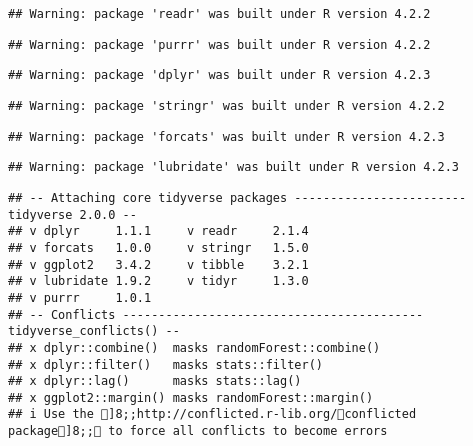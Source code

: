 \documentclass[
]{article}
\begin{document}
\begin{verbatim}
## Warning: package 'readr' was built under R version 4.2.2
\end{verbatim}

\begin{verbatim}
## Warning: package 'purrr' was built under R version 4.2.2
\end{verbatim}

\begin{verbatim}
## Warning: package 'dplyr' was built under R version 4.2.3
\end{verbatim}

\begin{verbatim}
## Warning: package 'stringr' was built under R version 4.2.2
\end{verbatim}

\begin{verbatim}
## Warning: package 'forcats' was built under R version 4.2.3
\end{verbatim}

\begin{verbatim}
## Warning: package 'lubridate' was built under R version 4.2.3
\end{verbatim}

\begin{verbatim}
## -- Attaching core tidyverse packages ------------------------ tidyverse 2.0.0 --
## v dplyr     1.1.1     v readr     2.1.4
## v forcats   1.0.0     v stringr   1.5.0
## v ggplot2   3.4.2     v tibble    3.2.1
## v lubridate 1.9.2     v tidyr     1.3.0
## v purrr     1.0.1     
## -- Conflicts ------------------------------------------ tidyverse_conflicts() --
## x dplyr::combine()  masks randomForest::combine()
## x dplyr::filter()   masks stats::filter()
## x dplyr::lag()      masks stats::lag()
## x ggplot2::margin() masks randomForest::margin()
## i Use the ]8;;http://conflicted.r-lib.org/conflicted package]8;; to force all conflicts to become errors
\end{verbatim}
\end{document}

